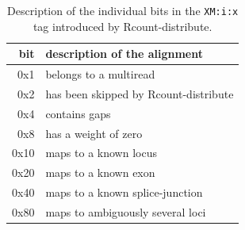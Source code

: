 \documentclass[a4paper,10pt]{article}
\begin{document}
\begin{table}[!h]
\centering
\caption{Description of the individual bits in the \texttt{XM:i:x} tag introduced by Rcount-distribute. }\label{bitTable}
\vspace{8pt}
\begin{tabular}{r l}
\hline
bit&description of the alignment\\
\hline
0x1&	belongs to a multiread \\
0x2&	has been skipped by Rcount-distribute \\
0x4&	contains gaps \\
0x8&	has a weight of zero \\
0x10&	maps to a known locus \\
0x20&	maps to a known exon \\
0x40&	maps to a known splice-junction \\
0x80&	maps to ambiguously several loci \\
\hline
\end{tabular}
\end{table}
\clearpage
\end{document}
